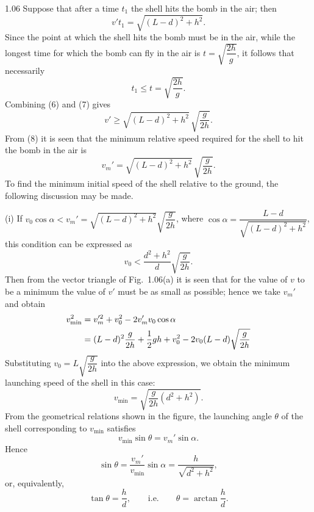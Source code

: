 \begin{solution}{1.06}
Suppose that after a time $t_1$ the shell hits the bomb in the air; then
\begin{equation}
v't_1=\sqrt{(L-d)^2+h^2}. \tag{6}
\end{equation}
Since the point at which the shell hits the bomb must be in the air, while the longest time for which the bomb can fly in the air is $t=\sqrt{\dfrac{2h}{g}}$, it follows that necessarily
\begin{equation}
t_1\leq t=\sqrt{\frac{2h}{g}}. \tag{7}
\end{equation}
Combining (6) and (7) gives
\begin{equation}
v'\geq\sqrt{(L-d)^2+h^2}\,\sqrt{\frac{g}{2h}}. \tag{8}
\end{equation}
From (8) it is seen that the minimum relative speed required for the shell to hit the bomb in the air is
\[
v_m'=\sqrt{(L-d)^2+h^2}\,\sqrt{\frac{g}{2h}}.
\]
To find the minimum initial speed of the shell relative to the ground, the following discussion may be made.

(i) If $v_0\cos\alpha<v_m'=\sqrt{(L-d)^2+h^2}\sqrt{\dfrac{g}{2h}}$, where $\cos\alpha=\dfrac{L-d}{\sqrt{(L-d)^2+h^2}}$, this condition can be expressed as
\[
v_0<\frac{d^2+h^2}{d}\sqrt{\frac{g}{2h}}.
\]
Then from the vector triangle of Fig.~1.06(a) it is seen that for the value of $v$ to be a minimum the value of $v'$ must be as small as possible; hence we take $v_m'$ and obtain
\begin{align}
v_{\min}^2&=v_m'^2+v_0^2-2v_m'v_0\cos\alpha\notag\\
&=(L-d)^2\frac{g}{2h}+\frac{1}{2}gh+v_0^2-2v_0(L-d)\sqrt{\frac{g}{2h}}\notag
\end{align}
Substituting $v_0=L\sqrt{\dfrac{g}{2h}}$ into the above expression, we obtain the minimum launching speed of the shell in this case:
\[
v_{\min}=\sqrt{\frac{g}{2h}(d^2+h^2)}.
\]
From the geometrical relations shown in the figure, the launching angle $\theta$ of the shell corresponding to $v_{\min}$ satisfies
\[
v_{\min}\sin\theta=v_m'\sin\alpha.
\]
Hence
\[
\sin\theta=\frac{v_m'}{v_{\min}}\sin\alpha=\frac{h}{\sqrt{d^2+h^2}},
\]
or, equivalently,
\[
\tan\theta=\frac{h}{d},\qquad\text{i.e.}\qquad \theta=\arctan\frac{h}{d}.
\]


\end{solution}
